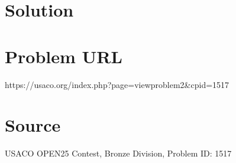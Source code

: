 \documentclass[12pt]{article}
\begin{document}
\section*{Solution}


\section*{Problem URL}
https://usaco.org/index.php?page=viewproblem2&cpid=1517

\section*{Source}
USACO OPEN25 Contest, Bronze Division, Problem ID: 1517
\end{document}
